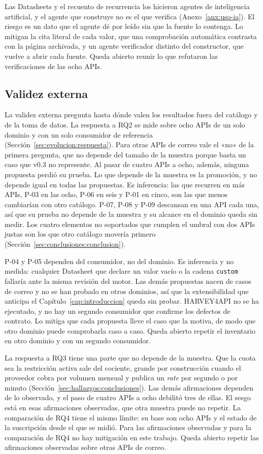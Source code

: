 Las Datasheets y el recuento de recurrencia los hicieron agentes de inteligencia artificial, y el agente que construye no es el que verifica (Anexo~\ref{anx:uso-ia}).
El riesgo es un dato que el agente dé por leído sin que la fuente lo contenga.
Lo mitigan la cita literal de cada valor, que una comprobación automática contrasta con la página archivada, y un agente verificador distinto del constructor, que vuelve a abrir cada fuente.
Queda abierto reunir lo que refutaron las verificaciones de las ocho APIs.

\subsection{Validez externa}\label{sec:conclusiones:externa}

La validez externa pregunta hasta dónde valen los resultados fuera del catálogo y de la toma de datos.
La respuesta a RQ2 se mide sobre ocho APIs de un solo dominio y con un solo consumidor de referencia (Sección~\ref{sec:evolucion:respuesta}).
Para otras APIs de correo vale el «no» de la primera pregunta, que no depende del tamaño de la muestra porque basta un caso que v0.3 no represente.
Al pasar de cuatro APIs a ocho, además, ninguna propuesta perdió su prueba.
Lo que depende de la muestra es la promoción, y no depende igual en todas las propuestas.
Es inferencia: las que recurren en más APIs, P-03 en las ocho, P-06 en seis y P-01 en cinco, son las que menos cambiarían con otro catálogo.
P-07, P-08 y P-09 descansan en una API cada una, así que su prueba no depende de la muestra y su alcance en el dominio queda sin medir.
Los cuatro elementos no soportados que cumplen el umbral con dos APIs justas son los que otro catálogo movería primero (Sección~\ref{sec:conclusiones:conclusion}).

P-04 y P-05 dependen del consumidor, no del dominio.
Es inferencia y no medida: cualquier Datasheet que declare un valor vacío o la cadena \texttt{custom} fallaría ante la misma revisión del motor.
Las demás propuestas nacen de casos de correo y no se han probado en otros dominios, así que la extensibilidad que anticipa el Capítulo~\ref{cap:introduccion} queda sin probar.
HARVEY4API no se ha ejecutado, y no hay un segundo consumidor que confirme los defectos de contrato.
Lo mitiga que cada propuesta lleve el caso que la motiva, de modo que otro dominio puede comprobarla caso a caso.
Queda abierto repetir el inventario en otro dominio y con un segundo consumidor.

La respuesta a RQ3 tiene una parte que no depende de la muestra.
Que la cuota sea la restricción activa sale del cociente, grande por construcción cuando el proveedor cobra por volumen mensual y publica un \textit{rate} por segundo o por minuto (Sección~\ref{sec:hallazgos:conclusiones}).
Las demás afirmaciones dependen de lo observado, y el paso de cuatro APIs a ocho debilitó tres de ellas.
El sesgo está en esas afirmaciones observadas, que otra muestra puede no repetir.
La comparación de RQ4 tiene el mismo límite: su base son ocho APIs y el estado de la suscripción desde el que se midió.
Para las afirmaciones observadas y para la comparación de RQ4 no hay mitigación en este trabajo.
Queda abierto repetir las afirmaciones observadas sobre otras APIs de correo.


